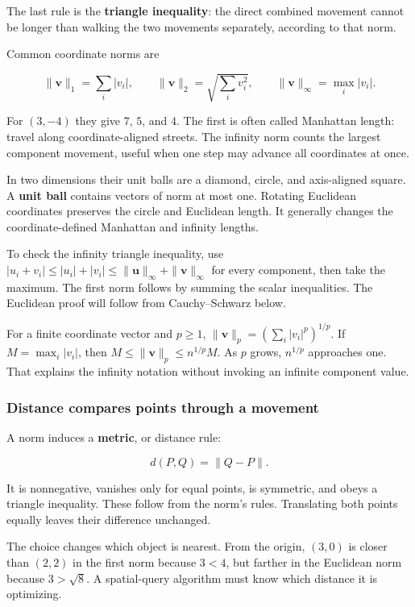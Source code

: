 The last rule is the \textbf{triangle inequality}: the direct combined movement cannot be longer than walking the two movements separately, according to that norm.

Common coordinate norms are

\[
\|\mathbf v\|_1=\sum_i|v_i|,\qquad
\|\mathbf v\|_2=\sqrt{\sum_iv_i^2},\qquad
\|\mathbf v\|_\infty=\max_i|v_i|.
\]

For \((3,-4)\) they give \(7\), \(5\), and \(4\). The first is often called Manhattan length: travel along coordinate-aligned streets. The infinity norm counts the largest component movement, useful when one step may advance all coordinates at once.

In two dimensions their unit balls are a diamond, circle, and axis-aligned square. A \textbf{unit ball} contains vectors of norm at most one. Rotating Euclidean coordinates preserves the circle and Euclidean length. It generally changes the coordinate-defined Manhattan and infinity lengths.

To check the infinity triangle inequality, use \(|u_i+v_i|\le|u_i|+|v_i|\le\|\mathbf u\|_\infty+\|\mathbf v\|_\infty\) for every component, then take the maximum. The first norm follows by summing the scalar inequalities. The Euclidean proof will follow from Cauchy--Schwarz below.

For a finite coordinate vector and \(p\ge1\), \(\|\mathbf v\|_p=(\sum_i|v_i|^p)^{1/p}\). If \(M=\max_i|v_i|\), then \(M\le\|\mathbf v\|_p\le n^{1/p}M\). As \(p\) grows, \(n^{1/p}\) approaches one. That explains the infinity notation without invoking an infinite component value.

\subsubsection{Distance compares points through a movement}\label{distance-compares-points-through-a-movement}

A norm induces a \textbf{metric}, or distance rule:

\[
d(P,Q)=\|Q-P\|.
\]

It is nonnegative, vanishes only for equal points, is symmetric, and obeys a triangle inequality. These follow from the norm's rules. Translating both points equally leaves their difference unchanged.

The choice changes which object is nearest. From the origin, \((3,0)\) is closer than \((2,2)\) in the first norm because \(3<4\), but farther in the Euclidean norm because \(3>\sqrt8\). A spatial-query algorithm must know which distance it is optimizing.

